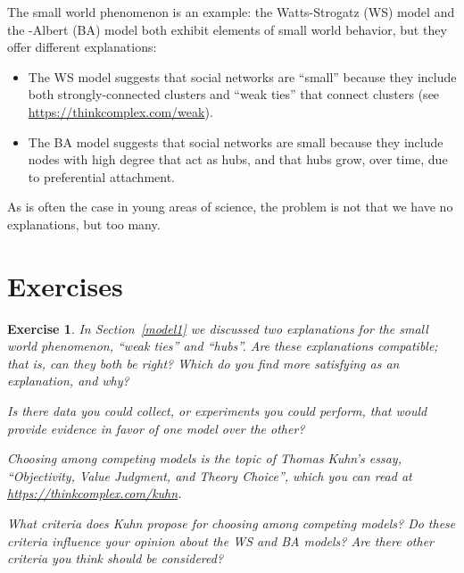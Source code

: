 \documentclass[12pt]{book}
\theoremstyle{exercise}
\newtheorem{exercise}{Exercise}[chapter]
\begin{document}

The small world phenomenon is an example: the Watts-Strogatz (WS)
model and the \Barabasi-Albert (BA) model both exhibit elements of
small world behavior, but they offer different explanations:

\begin{itemize}

\item The WS model suggests that social networks are ``small'' because
  they include both strongly-connected clusters and ``weak ties'' that
  connect clusters (see \url{https://thinkcomplex.com/weak}).


\item The BA model suggests that social networks are small because
  they include nodes with high degree that act as hubs, and that
  hubs grow, over time, due to preferential attachment.


\end{itemize}

As is often the case in young areas of science, the problem is
not that we have no explanations, but too many.


\section{Exercises}

\begin{exercise}

In Section~\ref{model1} we discussed two explanations for the
small world phenomenon, ``weak ties'' and ``hubs''.
Are these explanations compatible; that is, can they both be right?
Which do you find more satisfying as an explanation, and why?


Is there data you could collect, or experiments you could perform,
that would provide evidence in favor of one model over the other?

Choosing among competing models is the topic of Thomas Kuhn's
essay, ``Objectivity, Value Judgment, and Theory Choice'', which
you can read at \url{https://thinkcomplex.com/kuhn}.


What criteria does Kuhn propose for choosing among competing models?
Do these criteria influence your opinion about the WS and BA models?
Are there other criteria you think should be considered?

\end{exercise}
\end{document}
